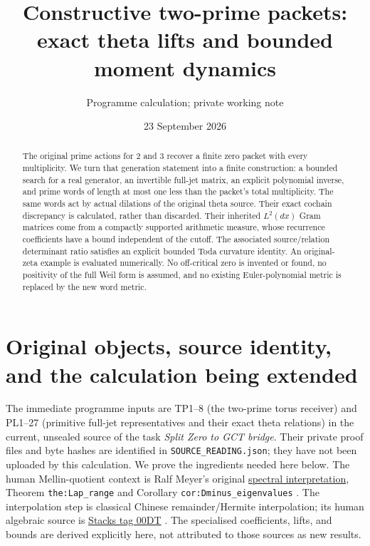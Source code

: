 \documentclass[11pt]{article}
\title{Constructive two-prime packets:\\exact theta lifts and bounded moment dynamics}
\author{Programme calculation; private working note}
\date{23 September 2026}
\begin{document}
\maketitle
\begin{abstract}
The original prime actions for 2 and 3 recover a finite zero packet with
every multiplicity. We turn that generation statement into a finite
construction: a bounded search for a real generator, an invertible
full-jet matrix, an explicit polynomial inverse, and prime words of
length at most one less than the packet's total multiplicity.
The same words act by actual dilations of the original theta source.
Their exact cochain discrepancy is calculated, rather than discarded.
Their inherited $L^2(dx)$ Gram matrices come from a compactly supported
arithmetic measure, whose recurrence coefficients have a bound
independent of the cutoff. The associated source/relation determinant
ratio satisfies an explicit bounded Toda curvature identity.
An original-zeta example is evaluated numerically. No off-critical zero
is invented or found, no positivity of the full Weil form is assumed,
and no existing Euler-polynomial metric is replaced by the new word metric.
\end{abstract}

\section{Original objects, source identity, and the calculation being extended}
The immediate programme inputs are TP1--8 (the two-prime torus receiver)
and PL1--27 (primitive full-jet representatives and their exact theta
relations) in the current, unsealed source of the task
\emph{Split Zero to GCT bridge}. Their private proof files and byte hashes
are identified in \texttt{SOURCE\_READING.json}; they have not been uploaded
by this calculation. We prove the ingredients needed here below.
The human Mellin-quotient context is Ralf Meyer's original
\href{https://arxiv.org/abs/math/0412277}{spectral interpretation},
Theorem \texttt{the:Lap\_range} and Corollary
\texttt{cor:Dminus\_eigenvalues} \cite{Meyer}. The interpolation step is
classical Chinese remainder/Hermite interpolation; its human algebraic
source is \href{https://stacks.math.columbia.edu/tag/00DT}{Stacks tag 00DT}
\cite{Stacks}. The specialised coefficients, lifts, and bounds are
derived explicitly here, not attributed to those sources as new results.
\end{document}
